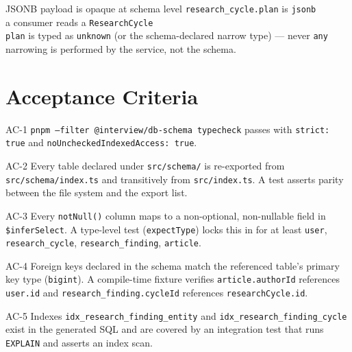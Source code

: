 \begin{scenario}{JSONB payload is opaque at schema level}
\Given \texttt{research\_cycle.plan} is \texttt{jsonb} \\
\When a consumer reads a \texttt{ResearchCycle} \\
\Then \texttt{plan} is typed as \texttt{unknown} (or the schema-declared narrow
type) --- never \texttt{any} \\
\And narrowing is performed by the service, not the schema.
\end{scenario}

\section{Acceptance Criteria}

\begin{ac}{AC-1}
\texttt{pnpm --filter @interview/db-schema typecheck} passes with
\texttt{strict: true} and \texttt{noUncheckedIndexedAccess: true}.
\end{ac}

\begin{ac}{AC-2}
Every table declared under \texttt{src/schema/} is re-exported from
\texttt{src/schema/index.ts} and transitively from \texttt{src/index.ts}. A test
asserts parity between the file system and the export list.
\end{ac}

\begin{ac}{AC-3}
Every \texttt{notNull()} column maps to a non-optional, non-nullable field in
\texttt{\$inferSelect}. A type-level test (\texttt{expectType}) locks this in
for at least \texttt{user}, \texttt{research\_cycle}, \texttt{research\_finding},
\texttt{article}.
\end{ac}

\begin{ac}{AC-4}
Foreign keys declared in the schema match the referenced table's primary key
type (\texttt{bigint}). A compile-time fixture verifies
\texttt{article.authorId} references \texttt{user.id} and
\texttt{research\_finding.cycleId} references \texttt{researchCycle.id}.
\end{ac}

\begin{ac}{AC-5}
Indexes \texttt{idx\_research\_finding\_entity} and
\texttt{idx\_research\_finding\_cycle} exist in the generated SQL and are
covered by an integration test that runs \texttt{EXPLAIN} and asserts an
index scan.
\end{ac}

